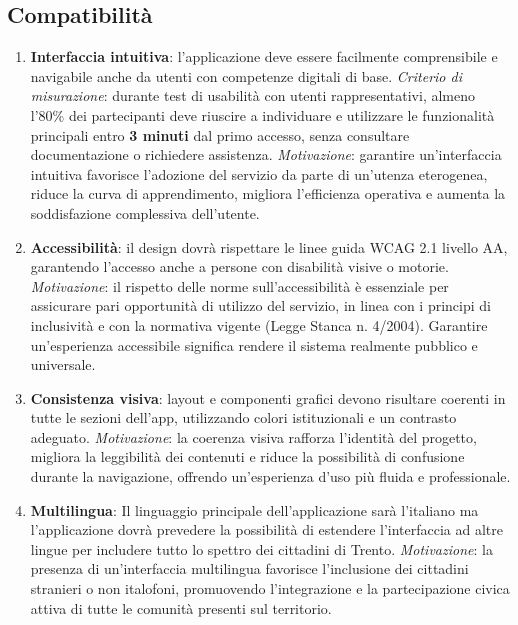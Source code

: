 \documentclass{article}
\begin{document}
\subsection{Compatibilità}
\begin{enumerate}[label=\textbf{RNF\arabic*}]
  \item \textbf{Interfaccia intuitiva}: l’applicazione deve essere facilmente comprensibile e navigabile anche da utenti con competenze digitali di base.  
  \textit{Criterio di misurazione}: durante test di usabilità con utenti rappresentativi, almeno l’80\% dei partecipanti deve riuscire a individuare e utilizzare le funzionalità principali entro \textbf{3 minuti} dal primo accesso, senza consultare documentazione o richiedere assistenza.  
  \textit{Motivazione}: garantire un’interfaccia intuitiva favorisce l’adozione del servizio da parte di un’utenza eterogenea, riduce la curva di apprendimento, migliora l’efficienza operativa e aumenta la soddisfazione complessiva dell’utente.

	\item \textbf{Accessibilità}: il design dovrà rispettare le linee guida WCAG 2.1 livello AA, garantendo l’accesso anche a persone con disabilità visive o motorie.  
	\textit{Motivazione}: il rispetto delle norme sull’accessibilità è essenziale per assicurare pari opportunità di utilizzo del servizio, in linea con i principi di inclusività e con la normativa vigente (Legge Stanca n. 4/2004). Garantire un’esperienza accessibile significa rendere il sistema realmente pubblico e universale.

	\item \textbf{Consistenza visiva}: layout e componenti grafici devono risultare coerenti in tutte le sezioni dell’app, utilizzando colori istituzionali e un contrasto adeguato.  
	\textit{Motivazione}: la coerenza visiva rafforza l’identità del progetto, migliora la leggibilità dei contenuti e riduce la possibilità di confusione durante la navigazione, offrendo un’esperienza d’uso più fluida e professionale.

	\item \textbf{Multilingua}: Il linguaggio principale dell'applicazione sarà l'italiano ma l’applicazione dovrà prevedere la possibilità di estendere l’interfaccia ad altre lingue per includere tutto lo spettro dei cittadini di Trento.  
	\textit{Motivazione}: la presenza di un’interfaccia multilingua favorisce l’inclusione dei cittadini stranieri o non italofoni, promuovendo l’integrazione e la partecipazione civica attiva di tutte le comunità presenti sul territorio.
\end{enumerate}
\end{document}

